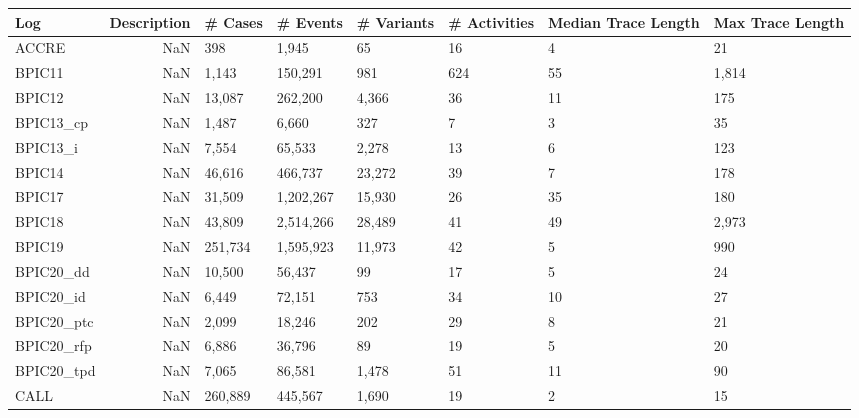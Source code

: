 \begin{tabular}{lrllllll}
\toprule
       Log &  Description & \# Cases & \# Events & \# Variants & \# Activities & Median Trace Length & Max Trace Length \\
\midrule
     ACCRE &          NaN &      398 &     1,945 &          65 &            16 &                   4 &               21 \\
    BPIC11 &          NaN &    1,143 &   150,291 &         981 &           624 &                  55 &            1,814 \\
    BPIC12 &          NaN &   13,087 &   262,200 &       4,366 &            36 &                  11 &              175 \\
 BPIC13_cp &          NaN &    1,487 &     6,660 &         327 &             7 &                   3 &               35 \\
  BPIC13_i &          NaN &    7,554 &    65,533 &       2,278 &            13 &                   6 &              123 \\
    BPIC14 &          NaN &   46,616 &   466,737 &      23,272 &            39 &                   7 &              178 \\
    BPIC17 &          NaN &   31,509 & 1,202,267 &      15,930 &            26 &                  35 &              180 \\
    BPIC18 &          NaN &   43,809 & 2,514,266 &      28,489 &            41 &                  49 &            2,973 \\
    BPIC19 &          NaN &  251,734 & 1,595,923 &      11,973 &            42 &                   5 &              990 \\
 BPIC20_dd &          NaN &   10,500 &    56,437 &          99 &            17 &                   5 &               24 \\
 BPIC20_id &          NaN &    6,449 &    72,151 &         753 &            34 &                  10 &               27 \\
BPIC20_ptc &          NaN &    2,099 &    18,246 &         202 &            29 &                   8 &               21 \\
BPIC20_rfp &          NaN &    6,886 &    36,796 &          89 &            19 &                   5 &               20 \\
BPIC20_tpd &          NaN &    7,065 &    86,581 &       1,478 &            51 &                  11 &               90 \\
      CALL &          NaN &  260,889 &   445,567 &       1,690 &            19 &                   2 &               15 \\

\end{tabular}
